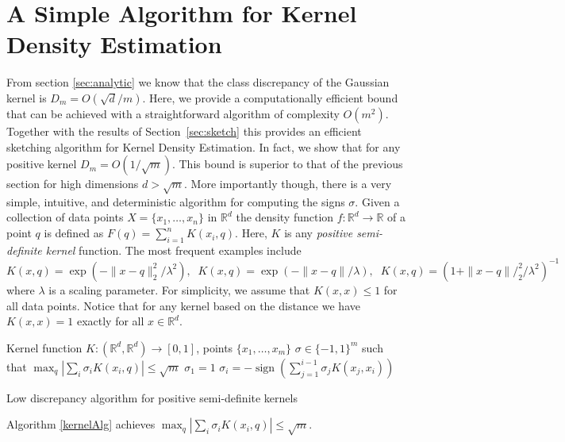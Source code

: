 \documentclass[anon,12pt]{colt2019} %
\newcommand{\R}{\mathbb{R}}
\begin{document}
{%


\section{A Simple Algorithm for Kernel Density Estimation}
From section \ref{sec:analytic} we know that the class discrepancy of the Gaussian kernel is $D_m = O(\sqrt{d}/m)$. 
Here, we provide a computationally efficient bound that can be achieved with a straightforward algorithm of complexity $O(m^2)$. Together with the results of Section~\ref{sec:sketch} this provides an efficient sketching algorithm for Kernel Density Estimation. 
In fact, we show that for any positive kernel $D_m = O(1/\sqrt{m})$. This bound is superior to that of the previous section for high dimensions $d > \sqrt{m}$. More importantly though, there is a very simple, intuitive, and deterministic algorithm for computing the signs $\sigma$. 
Given a collection of data points $X = \{x_1,\ldots, x_n\}$ in $\R^d$ the density function $f: \R^d \rightarrow \R$ of a point $q$ is defined as $ F(q) = \sum_{i=1}^{n} K(x_i,q) $.
Here, $K$ is any \emph{positive semi-definite kernel} function. The most frequent examples include
$$ K(x,q) = \exp(- \|x-q\|_2^2/\lambda^2),\;\; K(x,q) = \exp(- \|x-q\|/\lambda) ,\;\;  K(x,q) = (1+\|x-q\|/_2^2/\lambda^2)^{-1}$$
where $\lambda$ is a scaling parameter. For simplicity, we assume that $K(x,x) \leq 1$ for all data points. Notice that for any kernel based on the distance we have $K(x,x)=1$ exactly for all $x \in \R^d$.

\begin{algorithm}
\begin{algorithmic}
 Kernel function $K:(\R^d,\R^d)\rightarrow[0,1]$, points  $\{x_1,\ldots,x_m\}$
 $\sigma \in \{-1,1\}^m$ such that $\max_q |\sum_i \sigma_i K(x_i,q) | \le \sqrt{m}$
\STATE$\sigma_1 = 1$
        \STATE $\sigma_i = -\operatorname{sign} (\sum_{j=1}^{i-1}\sigma_j  K(x_j, x_i))$
\ENDFOR 
\end{algorithmic}
\caption{Low discrepancy algorithm for positive semi-definite kernels}\label{kernelAlg}
\end{algorithm}


\begin{theorem} \label{thm:disc simple kernel}
Algorithm \ref{kernelAlg} achieves $\max_q |\sum_i \sigma_i K(x_i,q) | \le \sqrt{m}$.
\end{theorem}

}
\end{document}
